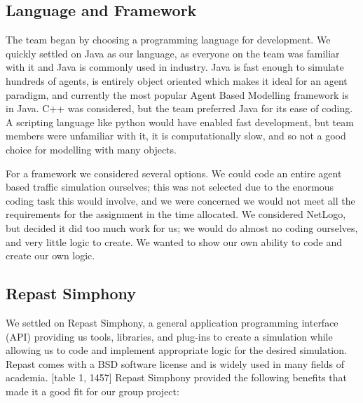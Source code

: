 \documentclass[11pt]{article}
\begin{document}
\subsection{Language and Framework}

The team began by choosing a programming language for development. We quickly settled on Java as our language, as everyone on the team was familiar with it and Java is commonly used in industry. Java is fast enough to simulate hundreds of agents, is entirely object oriented which makes it ideal for an agent paradigm, and currently the most popular Agent Based Modelling framework is in Java. C++ was considered, but the team preferred Java for its ease of coding. A scripting language like python would have enabled fast development, but team members were unfamiliar with it, it is computationally slow, and so not a good choice for modelling with many objects.

For a framework we considered several options. We could code an entire agent based traffic simulation ourselves; this was not selected due to the enormous coding task this would involve, and we were concerned we would not meet all the requirements for the assignment in the time allocated. We considered NetLogo, but decided it did too much work for us; we would do almost no coding ourselves, and very little logic to create. We wanted to show our own ability to code and create our own logic.



\subsection{Repast Simphony}

We settled on Repast Simphony, a general application programming interface (API) providing us tools, libraries, and plug-ins to create a simulation while allowing us to code and implement appropriate logic for the desired simulation. Repast comes with a BSD software license and is widely used in many fields of academia.\cite{5e} [table 1, 1457] Repast Simphony provided the following benefits that made it a good fit for our group project:
\end{document}
